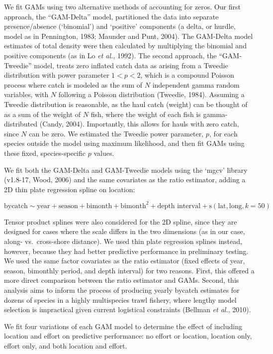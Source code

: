 \documentclass[]{article}
\begin{document}
We fit GAMs using two alternative methods of accounting for zeros. Our
first approach, the ``GAM-Delta'' model, partitioned the data into
separate presence/absence (`binomial') and `positive' components (a
delta, or hurdle, model as in Pennington, 1983; Maunder and Punt, 2004).
The GAM-Delta model estimates of total density were then calculated by
multiplying the binomial and positive components (as in Lo \emph{et
al.}, 1992). The second approach, the ``GAM-Tweedie'' model, treats zero
inflated catch data as arising from a Tweedie distribution with power
parameter \(1 < p < 2\), which is a compound Poisson process where catch
is modeled as the sum of \(N\) independent gamma random variables, with
\(N\) following a Poisson distribution (Tweedie, 1984). Assuming a
Tweedie distribution is reasonable, as the haul catch (weight) can be
thought of as a sum of the weight of \(N\) fish, where the weight of
each fish is gamma-distributed (Candy, 2004). Importantly, this allows
for hauls with zero catch, since \(N\) can be zero. We estimated the
Tweedie power parameter, \(p\), for each species outside the model using
maximum likelihood, and then fit GAMs using these fixed,
species-specific \(p\) values.

We fit both the GAM-Delta and GAM-Tweedie models using the `mgcv'
library (v1.8-17, Wood, 2006) and the same covariates as the ratio
estimator, adding a 2D thin plate regression spline on location:

\[ \text{bycatch} \sim \text{year} + \text{season} + \text{bimonth} + \text{bimonth}^2 + \text{depth interval} + \text{s}(\text{lat}, \text{long}, k=50) \]

Tensor product splines were also considered for the 2D spline, since
they are designed for cases where the scale differs in the two
dimensions (as in our case, along- vs.~cross-shore distance). We used
thin plate regression splines instead, however, because they had better
predictive performance in preliminary testing. We used the same factor
covariates as the ratio estimator (fixed effects of year, season,
bimonthly period, and depth interval) for two reasons. First, this
offered a more direct comparison between the ratio estimator and GAMs.
Second, this analysis aims to inform the process of producing yearly
bycatch estimates for dozens of species in a highly multispecies trawl
fishery, where lengthy model selection is impractical given current
logistical constraints (Bellman \emph{et al.}, 2010).

We fit four variations of each GAM model to determine the effect of
including location and effort on predictive performance: no effort or
location, location only, effort only, and both location and effort.
\end{document}
